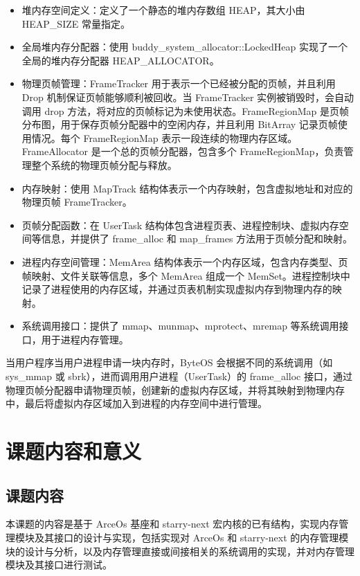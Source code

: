 \begin{itemize}
\item 堆内存空间定义：定义了一个静态的堆内存数组 HEAP，其大小由 HEAP\_SIZE 常量指定。
\item 全局堆内存分配器：使用 buddy\_system\_allocator::LockedHeap 实现了一个全局的堆内存分配器 HEAP\_ALLOCATOR。
\item 物理页帧管理：FrameTracker 用于表示一个已经被分配的页帧，并且利用 Drop 机制保证页帧能够顺利被回收。当 FrameTracker 实例被销毁时，会自动调用 drop 方法，将对应的页帧标记为未使用状态。FrameRegionMap 是页帧分布图，用于保存页帧分配器中的空闲内存，并且利用 BitArray 记录页帧使用情况。每个 FrameRegionMap 表示一段连续的物理内存区域。FrameAllocator 是一个总的页帧分配器，包含多个 FrameRegionMap，负责管理整个系统的物理页帧分配与释放。
\item 内存映射：使用 MapTrack 结构体表示一个内存映射，包含虚拟地址和对应的物理页帧 FrameTracker。
\item 页帧分配函数：在 UserTask 结构体包含进程页表、进程控制块、虚拟内存空间等信息，并提供了 frame\_alloc 和 map\_frames 方法用于页帧分配和映射。
\item 进程内存空间管理：MemArea 结构体表示一个内存区域，包含内存类型、页帧映射、文件关联等信息，多个 MemArea 组成一个 MemSet。进程控制块中记录了进程使用的内存区域，并通过页表机制实现虚拟内存到物理内存的映射。
\item 系统调用接口：提供了 mmap、munmap、mprotect、mremap 等系统调用接口，用于进程内存管理。
\end{itemize}

当用户程序当用户进程申请一块内存时，ByteOS 会根据不同的系统调用（如 sys\_mmap 或 sbrk），进而调用用户进程（UserTask）的 frame\_alloc 接口，通过物理页帧分配器申请物理页帧，创建新的虚拟内存区域，并将其映射到物理内存中，最后将虚拟内存区域加入到进程的内存空间中进行管理。

\section{课题内容和意义}

\subsection{课题内容}

本课题的内容是基于 ArceOs 基座和 starry-next 宏内核的已有结构，实现内存管理模块及其接口的设计与实现，包括实现对 ArceOs 和 starry-next 的内存管理模块的设计与分析，以及内存管理直接或间接相关的系统调用的实现，并对内存管理模块及其接口进行测试。

